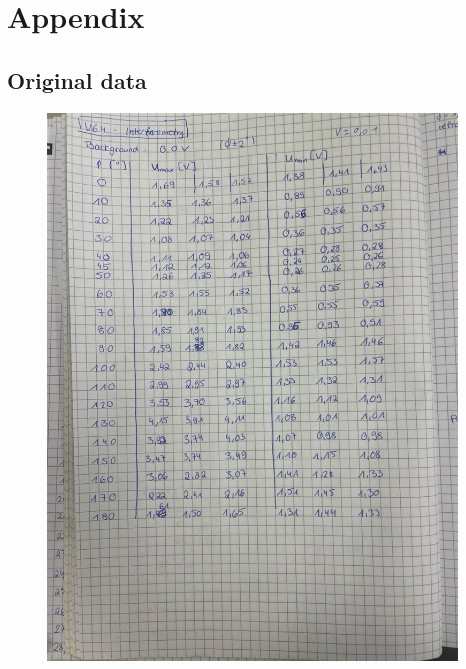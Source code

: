 \section{Appendix}
\label{sec:Appendix}
\subsection{Original data}
\begin{figure}[H]
  \centering
  \includegraphics[width=0.97\textwidth]{Messdaten/1.pdf}
  \label{fig:Messdaten1}
\end{figure}
